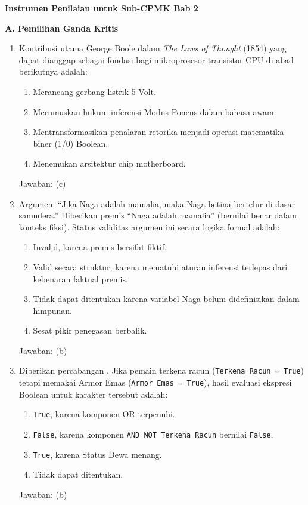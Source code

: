\documentclass[../main]{subfiles}
\begin{document}
\begin{asesmen}
\textbf{Instrumen Penilaian untuk Sub-CPMK Bab 2}

\textbf{A. Pemilihan Ganda Kritis}

\begin{enumerate}
  \item Kontribusi utama George Boole dalam \textit{The Laws of Thought} (1854) yang dapat dianggap sebagai fondasi bagi mikroprosesor transistor CPU di abad berikutnya adalah:
  \begin{enumerate}
    \item Merancang gerbang listrik 5 Volt.
    \item Merumuskan hukum inferensi Modus Ponens dalam bahasa awam.
    \item Mentransformasikan penalaran retorika menjadi operasi matematika biner (1/0) Boolean.
    \item Menemukan arsitektur chip motherboard.
  \end{enumerate}
  Jawaban: (c)

  \item Argumen: ``Jika Naga adalah mamalia, maka Naga betina bertelur di dasar samudera.'' Diberikan premis ``Naga adalah mamalia'' (bernilai benar dalam konteks fiksi). Status validitas argumen ini secara logika formal adalah:
  \begin{enumerate}
    \item Invalid, karena premis bersifat fiktif.
    \item Valid secara struktur, karena mematuhi aturan inferensi terlepas dari kebenaran faktual premis.
    \item Tidak dapat ditentukan karena variabel Naga belum didefinisikan dalam himpunan.
    \item Sesat pikir penegasan berbalik.
  \end{enumerate}
  Jawaban: (b)

  \item Diberikan percabangan . Jika pemain terkena racun (\texttt{Terkena\_Racun = True}) tetapi memakai Armor Emas (\texttt{Armor\_Emas = True}), hasil evaluasi ekspresi Boolean untuk karakter tersebut adalah:
  \begin{enumerate}
    \item \texttt{True}, karena komponen OR terpenuhi.
    \item \texttt{False}, karena komponen \texttt{AND NOT Terkena\_Racun} bernilai \texttt{False}.
    \item \texttt{True}, karena Status Dewa menang.
    \item Tidak dapat ditentukan.
  \end{enumerate}
  Jawaban: (b)
\end{enumerate}


\end{asesmen}
\end{document}
